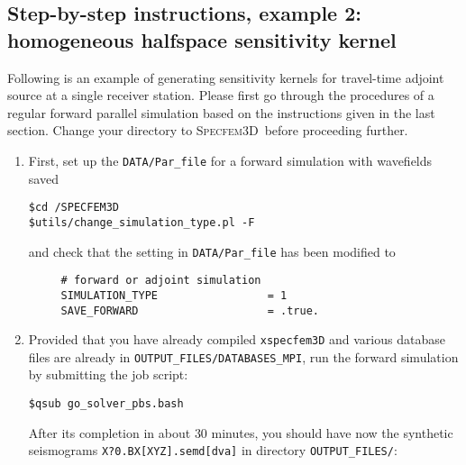 \documentclass[10pt,fleqn,letterpaper]{article}
\newcommand{\specfem}{\textsc{Specfem3D}}
\begin{document}

\subsection*{Step-by-step instructions, example 2: homogeneous halfspace sensitivity kernel}
Following is an example of generating sensitivity kernels for travel-time adjoint source at a single receiver station. Please first go through the procedures of a regular forward parallel simulation based on the instructions given in the last section. Change your directory to \specfem\ before proceeding further.
\begin{enumerate}

\item  First, set up the \verb+DATA/Par_file+ for a forward simulation with wavefields saved

\begin{lstlisting}
$cd /SPECFEM3D
$utils/change_simulation_type.pl -F
\end{lstlisting}
and check that the setting in \verb+DATA/Par_file+ has been modified to
\begin{lstlisting}
     # forward or adjoint simulation
     SIMULATION_TYPE                 = 1
     SAVE_FORWARD                    = .true.
\end{lstlisting}

\item Provided that you have already compiled \verb+xspecfem3D+ and various database files are already in \verb+OUTPUT_FILES/DATABASES_MPI+, 
  run the forward simulation by submitting the job script:
\begin{lstlisting}
$qsub go_solver_pbs.bash
\end{lstlisting}

After its completion in about $30$ minutes,  you should have now the synthetic seismograms \verb+X?0.BX[XYZ].semd[dva]+ in directory \verb+OUTPUT_FILES/+:



\end{enumerate}
\end{document}
